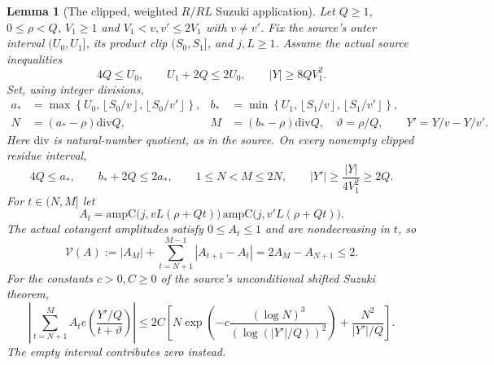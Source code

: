 \documentclass[11pt]{article}
\newtheorem{lemma}[theorem]{Lemma}
\theoremstyle{definition}
\theoremstyle{remark}
\newcommand{\1}{\mathbf 1}
\begin{document}
\begin{lemma}[The clipped, weighted $R/RL$ Suzuki application]
\label{lem:clipped-suzuki}
Let $Q\ge1$, $0\le\rho<Q$, $V_1\ge1$ and
$V_1<v,v'\le2V_1$ with $v\ne v'$. Fix the source's outer
interval $(U_0,U_1]$, its product clip $(S_0,S_1]$, and
$j,L\ge1$. Assume the \emph{actual source inequalities}
\begin{equation}\label{eq:suzuki-source-window}
 4Q\le U_0,\qquad U_1+2Q\le2U_0,
 \qquad |Y|\ge8QV_1^2.
\end{equation}
Set, using integer divisions,
\begin{align}
 a_*&=\max\!\left\{U_0,\left\lfloor S_0/v\right\rfloor,
                    \left\lfloor S_0/v'\right\rfloor\right\},
 & b_*&=\min\!\left\{U_1,\left\lfloor S_1/v\right\rfloor,
                    \left\lfloor S_1/v'\right\rfloor\right\},
 \label{eq:suzuki-actual-clip}\\
 N&=(a_*-\rho)\mathbin{\mathrm{div}}Q,
 &M&=(b_*-\rho)\mathbin{\mathrm{div}}Q,\quad
 \vartheta=\rho/Q,
 \qquad Y'=Y/v-Y/v'.
 \label{eq:suzuki-transformed}
\end{align}
Here $\mathrm{div}$ is natural-number quotient, as in the
source. On every nonempty clipped residue interval,
\begin{equation}\label{eq:suzuki-eligibility}
 4Q\le a_*,\qquad b_*+2Q\le2a_*,\qquad
 1\le N<M\le2N,\qquad
 |Y'|\ge\frac{|Y|}{4V_1^2}\ge2Q.
\end{equation}
For $t\in(N,M]$ let
\[
 A_t=\mathrm{ampC}\bigl(j,vL(\rho+Qt)\bigr)\,
     \mathrm{ampC}\bigl(j,v'L(\rho+Qt)\bigr).
\]
The actual cotangent amplitudes satisfy
$0\le A_t\le1$ and are nondecreasing in $t$, so
\begin{equation}\label{eq:suzuki-amplitude-variation}
 \mathcal V(A):=|A_M|+\sum_{t=N+1}^{M-1}|A_{t+1}-A_t|
     =2A_M-A_{N+1}\le2.
\end{equation}
For the constants $c>0,C\ge0$ of the source's unconditional
shifted Suzuki theorem,
\begin{equation}\label{eq:suzuki-clipped-conclusion}
 \left|\sum_{t=N+1}^M A_t
 e\!\left(\frac{Y'/Q}{t+\vartheta}\right)\right|
 \le2C\left[N\exp\left(
 -c\frac{(\log N)^3}{(\log(|Y'|/Q))^2}\right)
       +\frac{N^2}{|Y'|/Q}\right].
\end{equation}
The empty interval contributes zero instead.
\end{lemma}
\end{document}
